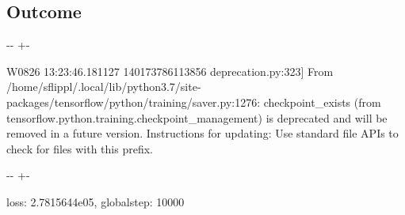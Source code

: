 \documentclass[letterpaper,10pt,english]{sphinxmanual}
\newlength\nbsphinxcodecellspacing
\begin{document}
\subsection{Outcome}
\label{\detokenize{usage/get_started:Outcome}}
{
\begin{sphinxVerbatim}[commandchars=\\\{\}]
\llap{\color{nbsphinxin}[5]:\,\hspace{\fboxrule}\hspace{\fboxsep}}
\end{sphinxVerbatim}
}



%
{
\kern-\sphinxverbatimsmallskipamount\kern-\baselineskip
\kern+\FrameHeightAdjust\kern-\fboxrule
\vspace{\nbsphinxcodecellspacing}
%
\begin{sphinxVerbatim}[commandchars=\\\{\}]
W0826 13:23:46.181127 140173786113856 deprecation.py:323] From /home/sflippl/.local/lib/python3.7/site-packages/tensorflow/python/training/saver.py:1276: checkpoint\_exists (from tensorflow.python.training.checkpoint\_management) is deprecated and will be removed in a future version.
Instructions for updating:
Use standard file APIs to check for files with this prefix.
\end{sphinxVerbatim}
}
\relax

{

\kern-\sphinxverbatimsmallskipamount\kern-\baselineskip
\kern+\FrameHeightAdjust\kern-\fboxrule
\vspace{\nbsphinxcodecellspacing}

\begin{sphinxVerbatim}[commandchars=\\\{\}]
\llap{\color{nbsphinxout}[5]:\,\hspace{\fboxrule}\hspace{\fboxsep}}\PYGZob{}\PYGZsq{}loss\PYGZsq{}: 2.7815644e\PYGZhy{}05, \PYGZsq{}global\PYGZus{}step\PYGZsq{}: 10000\PYGZcb{}
\end{sphinxVerbatim}
}
\end{document}
